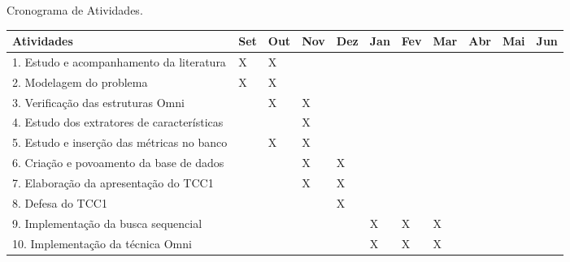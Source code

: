 \begin{quadro}[!htb]
    \caption{Cronograma de Atividades.\label{qua:quadro1}}
    \begin{tabular}{|p{4.5cm}|p{0.7cm}|p{0.7cm}|p{0.7cm}|p{0.7cm}|p{0.7cm}|p{0.7cm}|p{0.7cm}|p{0.7cm}|p{0.7cm}|p{0.7cm}|}
        \hline
        \textbf{Atividades} 						     & 	   \textbf{Set}      & \textbf{Out} & \textbf{Nov} & \textbf{Dez} & \textbf{Jan} & \textbf{Fev} & \textbf{Mar} & \textbf{Abr} & \textbf{Mai} & \textbf{Jun} \\
        \hline
        \small{1. Estudo e acompanhamento da literatura}		     & X	             & X            &  		   & 		  &  		 &   	        &   	       &   	      & 	     & 		     \\
        \hline
        \small{2. Modelagem do problema} 				     & X	             & X            &  		   & 		  &  		 &   	        &   	       &   	      & 	     &                \\
        \hline
	\small{3. Verificação das estruturas Omni} 			     &  	             & X            & X		   & 		  &  		 &   	        &   	       &   	      & 	     &                \\
        \hline
	\small{4. Estudo dos extratores de características} 		     &  	             &              & X		   & 		  &  		 &   	        &   	       &   	      & 	     & 		     \\
        \hline
	\small{5. Estudo e inserção das métricas no banco} 		     &  	             & X            & X		   &  		  &  		 &   	        &   	       &   	      & 	     & 		     \\
        \hline
	\small{6. Criação e povoamento da base de dados} 		     &  	             &              & X		   & X		  &  		 &   	        &   	       &   	      & 	     & 		     \\
        \hline
        \small{7. Elaboração da apresentação do TCC1}			     &  	             &              & X		   & X		  &  		 &   	        &   	       &   	      & 	     & 		     \\
        \hline        
        \small{8. Defesa do TCC1}                                            &  	             &              &  		   & X		  &  		 &   	        &   	       &   	      & 	     & 		     \\
        \hline
	\small{9. Implementação da busca sequencial} 			     &  	             &              &  		   & 		  & X		 & X	        & X 	       &   	      & 	     & 		     \\
        \hline
        \small{10. Implementação da técnica Omni} 			     &  	             &              &  		   & 		  & X		 & X 	        & X 	       &   	      & 	     & 		     \\

\end{tabular}
\end{quadro}
